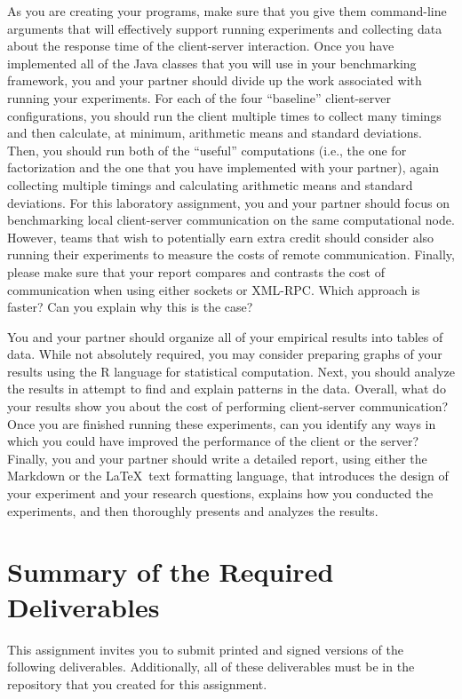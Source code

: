 As you are creating your programs, make sure that you give them command-line arguments that will effectively support
running experiments and collecting data about the response time of the client-server interaction. Once you have
implemented all of the Java classes that you will use in your benchmarking framework, you and your partner should divide
up the work associated with running your experiments. For each of the four ``baseline'' client-server configurations,
you should run the client multiple times to collect many timings and then calculate, at minimum, arithmetic means and
standard deviations. Then, you should run both of the ``useful'' computations (i.e., the one for factorization and the
one that you have implemented with your partner), again collecting multiple timings and calculating arithmetic means and
standard deviations. For this laboratory assignment, you and your partner should focus on benchmarking local
client-server communication on the same computational node. However, teams that wish to potentially earn extra credit
should consider also running their experiments to measure the costs of remote communication. Finally, please make sure
that your report compares and contrasts the cost of communication when using either sockets or XML-RPC. Which approach
is faster? Can you explain why this is the case?

You and your partner should organize all of your empirical results into tables of data. While not absolutely required,
you may consider preparing graphs of your results using the R language for statistical computation. Next, you should
analyze the results in attempt to find and explain patterns in the data. Overall, what do your results show you about
the cost of performing client-server communication? Once you are finished running these experiments, can you identify
any ways in which you could have improved the performance of the client or the server? Finally, you and your partner
should write a detailed report, using either the Markdown or the \LaTeX~text formatting language, that introduces the
design of your experiment and your research questions, explains how you conducted the experiments, and then thoroughly
presents and analyzes the results.

\section*{Summary of the Required Deliverables}

This assignment invites you to submit printed and signed versions of the following deliverables. Additionally,
all of these deliverables must be in the repository that you created for this assignment.

